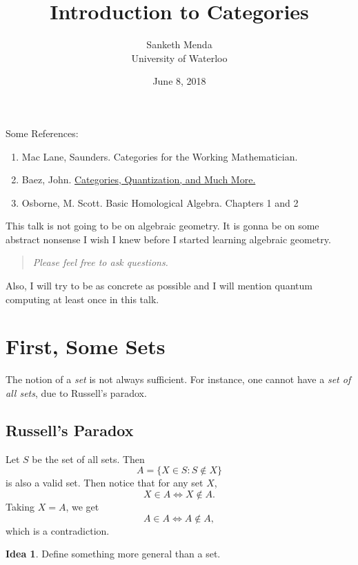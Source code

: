 \documentclass[english,12pt]{article}
\title{Introduction to Categories}
\author{Sanketh Menda\\
  University of Waterloo}
\date{June 8, 2018}
\theoremstyle{definition}
\newtheorem*{idea}{Idea}
\begin{document}
\maketitle

Some References:
\begin{enumerate}
\item Mac Lane, Saunders. Categories for the Working Mathematician.
\item Baez, John.
  \href{http://www.math.ucr.edu/home/baez/categories.html}{Categories,
    Quantization, and Much More.}
\item Osborne, M. Scott. Basic Homological Algebra. Chapters 1 and 2
\end{enumerate}

This talk is not going to be on algebraic geometry. It is gonna be on some
abstract nonsense I wish I knew before I started learning algebraic
geometry. 

\begin{quote}\it
  Please feel free to ask questions.
\end{quote}

Also, I will try to be as concrete as possible and I will mention quantum
computing at least once in this talk.

\section{First, Some Sets}

The notion of a \emph{set} is not always sufficient. For instance, one
cannot have a \emph{set of all sets}, due to Russell's paradox.

\subsection{Russell's Paradox}

Let $S$ be the set of all sets. Then
\begin{equation}
  A = \{X \in S: S \not\in X\}
\end{equation}
is also a valid set. Then notice that for any set $X$,
\begin{equation}
  X \in A \iff X \not\in A.
\end{equation}
Taking $X = A$, we get
\begin{equation}
  A \in A \iff A \not\in A,
\end{equation}
which is a contradiction.

\begin{idea}
  Define something more general than a set.
\end{idea}
\end{document}
